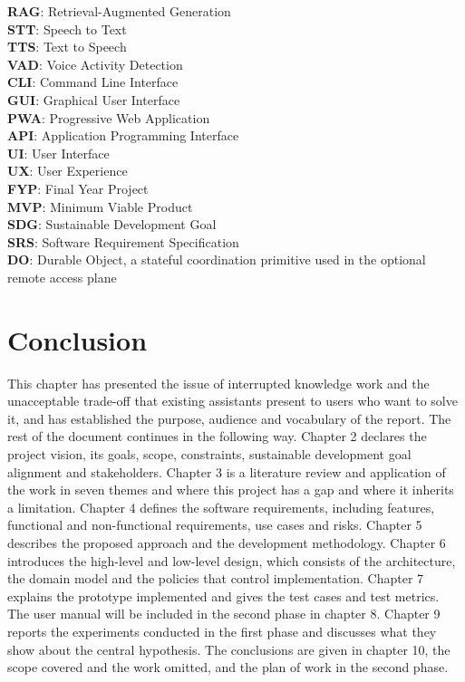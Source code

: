 \documentclass{FastFyp}
\begin{document}
\textbf{RAG}: Retrieval-Augmented Generation\\
\textbf{STT}: Speech to Text\\
\textbf{TTS}: Text to Speech\\
\textbf{VAD}: Voice Activity Detection\\
\textbf{CLI}: Command Line Interface\\
\textbf{GUI}: Graphical User Interface\\
\textbf{PWA}: Progressive Web Application\\
\textbf{API}: Application Programming Interface\\
\textbf{UI}: User Interface\\
\textbf{UX}: User Experience\\
\textbf{FYP}: Final Year Project\\
\textbf{MVP}: Minimum Viable Product\\
\textbf{SDG}: Sustainable Development Goal\\
\textbf{SRS}: Software Requirement Specification\\
\textbf{DO}: Durable Object, a stateful coordination primitive used in the optional remote access plane

\section{Conclusion}
This chapter has presented the issue of interrupted knowledge work and the unacceptable trade-off that existing assistants present to users who want to solve it, and has established the purpose, audience and vocabulary of the report. The rest of the document continues in the following way. Chapter 2 declares the project vision, its goals, scope, constraints, sustainable development goal alignment and stakeholders. Chapter 3 is a literature review and application of the work in seven themes and where this project has a gap and where it inherits a limitation. Chapter 4 defines the software requirements, including features, functional and non-functional requirements, use cases and risks. Chapter 5 describes the proposed approach and the development methodology. Chapter 6 introduces the high-level and low-level design, which consists of the architecture, the domain model and the policies that control implementation. Chapter 7 explains the prototype implemented and gives the test cases and test metrics. The user manual will be included in the second phase in chapter 8. Chapter 9 reports the experiments conducted in the first phase and discusses what they show about the central hypothesis. The conclusions are given in chapter 10, the scope covered and the work omitted, and the plan of work in the second phase.
\end{document}

